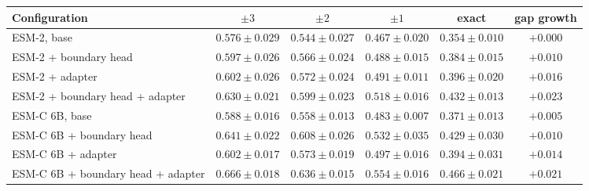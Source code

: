 \begin{tabular}{lccccc}
\toprule
\textbf{Configuration} & $\pm3$ & $\pm2$ & $\pm1$ & exact & \textbf{gap growth} \\
\midrule
ESM-2, base & $0.576 \pm 0.029$ & $0.544 \pm 0.027$ & $0.467 \pm 0.020$ & $0.354 \pm 0.010$ & $+0.000$ \\
ESM-2 + boundary head & $0.597 \pm 0.026$ & $0.566 \pm 0.024$ & $0.488 \pm 0.015$ & $0.384 \pm 0.015$ & $+0.010$ \\
ESM-2 + adapter & $0.602 \pm 0.026$ & $0.572 \pm 0.024$ & $0.491 \pm 0.011$ & $0.396 \pm 0.020$ & $+0.016$ \\
ESM-2 + boundary head + adapter & $0.630 \pm 0.021$ & $0.599 \pm 0.023$ & $0.518 \pm 0.016$ & $0.432 \pm 0.013$ & $+0.023$ \\
ESM-C 6B, base & $0.588 \pm 0.016$ & $0.558 \pm 0.013$ & $0.483 \pm 0.007$ & $0.371 \pm 0.013$ & $+0.005$ \\
ESM-C 6B + boundary head & $0.641 \pm 0.022$ & $0.608 \pm 0.026$ & $0.532 \pm 0.035$ & $0.429 \pm 0.030$ & $+0.010$ \\
ESM-C 6B + adapter & $0.602 \pm 0.017$ & $0.573 \pm 0.019$ & $0.497 \pm 0.016$ & $0.394 \pm 0.031$ & $+0.014$ \\
ESM-C 6B + boundary head + adapter & $0.666 \pm 0.018$ & $0.636 \pm 0.015$ & $0.554 \pm 0.016$ & $0.466 \pm 0.021$ & $+0.021$ \\
\bottomrule
\end{tabular}
